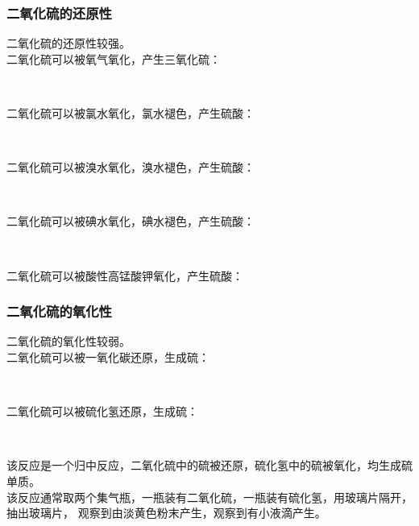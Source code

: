 \documentclass[UTF8]{ctexart}
\begin{document}
\subsubsection{二氧化硫的还原性}
    二氧化硫的还原性较强。\\[3mm]
    二氧化硫可以被氧气氧化，产生三氧化硫：
    \begin{center}
        \\[6mm]
    \end{center}
    二氧化硫可以被氯水氧化，氯水褪色，产生硫酸：
    \begin{center}
        \\[6mm]
    \end{center}
    二氧化硫可以被溴水氧化，溴水褪色，产生硫酸：
    \begin{center}
        \\[6mm]
    \end{center}
    二氧化硫可以被碘水氧化，碘水褪色，产生硫酸：
    \begin{center}
        \\[6mm]
    \end{center}
    二氧化硫可以被酸性高锰酸钾氧化，产生硫酸：
    \begin{center}
    \end{center}

\subsubsection{二氧化硫的氧化性}
    二氧化硫的氧化性较弱。\\[3mm]
    二氧化硫可以被一氧化碳还原，生成硫：
    \begin{center}
        \\[6mm]
    \end{center}
    二氧化硫可以被硫化氢还原，生成硫：
    \begin{center}
        \\[6mm]
    \end{center}
    该反应是一个归中反应，二氧化硫中的硫被还原，硫化氢中的硫被氧化，均生成硫单质。\\[3mm]
    该反应通常取两个集气瓶，一瓶装有二氧化硫，一瓶装有硫化氢，用玻璃片隔开，抽出玻璃片，
    观察到由淡黄色粉末产生，观察到有小液滴产生。
\end{document}
